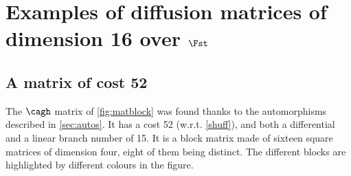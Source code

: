 \setcounter{section}{0}
\renewcommand\thesection{\Alph{section}}

\section{Examples of diffusion matrices of dimension 16 over $\Fst$}

\subsection{A matrix of cost 52}
\label{app:matt1}
The $\cagh$ matrix of \autoref{fig:matblock} was found thanks to the automorphisms described in \autoref{sec:autos}.
It has a cost 52 (w.r.t. \autoref{shuff}), and both a differential and a linear branch number of 15.
It is a block matrix made of sixteen square matrices of dimension four, eight of them being distinct.
The different blocks are highlighted by different colours in the figure.

